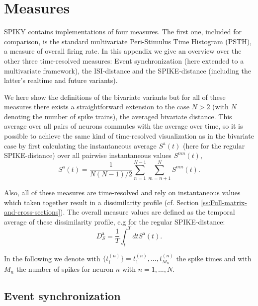 \documentclass[10pt,twocolumn]{elsart5p}
\begin{document}
\begin{appendix} \label{Appendix}

\section{\label{App-s:Measures} Measures}

SPIKY contains implementations of four measures. The first one, included for comparison, is the standard multivariate Peri-Stimulus Time Histogram (PSTH), a measure of overall firing rate. In this appendix we give an overview over the other three time-resolved measures: Event synchronization (here extended to a multivariate framework), the ISI-distance and the SPIKE-distance (including the latter's realtime and future variants).

We here show the definitions of the bivariate variants but for all of these measures there exists a straightforward extension to the case $N > 2$ (with $N$ denoting the number of spike trains), the averaged bivariate distance. This average over all pairs of neurons commutes with the average over time, so it is possible to achieve the same kind of time-resolved visualization as in the bivariate case by first calculating the instantaneous average $S^{\mathrm {a}} (t)$ (here for the regular SPIKE-distance) over all pairwise instantaneous values $S^{mn} (t)$,
%
\begin{equation} \label{eq:Bivariate-Average}
    S^{\mathrm {a}} (t) = \frac{1}{N(N-1)/2}\sum_{n=1}^{N-1} \sum_{m=n+1}^N S^{mn} (t).
\end{equation}

Also, all of these measures are time-resolved and rely on instantaneous values which taken together result in a dissimilarity profile (cf. Section \ref{ss:Full-matrix-and-cross-sections}). The overall measure values are defined as the temporal average of these dissimilarity profile, e.g for the regular SPIKE-distance:
%
\begin{equation} \label{eq:Temporal-Average2}
    D_S^{\mathrm {a}} = \frac{1}{T} \int_{t}^T dt S^{\mathrm {a}} (t).
\end{equation}

In the following we denote with $\{t_i^{(n)}\} = {t_1^{(n)},...,t_{M_n}^{(n)}}$ the spike times and with $M_n$ the number of spikes for neuron $n$ with $n = 1,...,N$.




\subsection{\label{App-ss:Event-Synchronization} Event synchronization}


\end{appendix}
\end{document}
